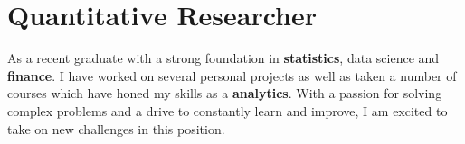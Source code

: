 
\section{Quantitative Researcher}
\small{
    As a recent graduate with a strong foundation in \textbf{statistics}, data science and \textbf{finance}. I have worked on several personal projects as well as taken a number of courses which have honed my skills as a \textbf{analytics}. With a passion for solving complex problems and a drive to constantly learn and improve, I am excited to take on new challenges in this position.
}